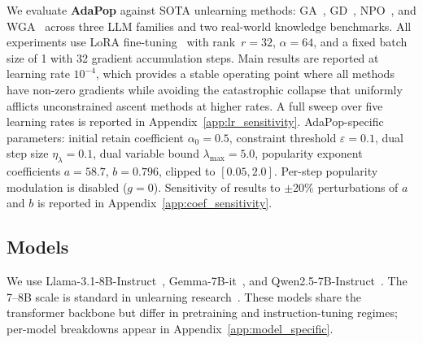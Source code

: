 







We evaluate \textbf{AdaPop} against SOTA unlearning methods: GA~\cite{jang2022knowledge}, GD~\cite{liu2022continual}, NPO~\cite{zhang2024negative}, and WGA~\cite{wang2025rethinking} across three LLM families and two real-world knowledge benchmarks. All experiments use LoRA fine-tuning~\cite{hu2021lora} with rank~$r{=}32$, $\alpha{=}64$, and a fixed batch size of 1 with 32 gradient accumulation steps. Main results are reported at learning rate $10^{-4}$, which provides a stable operating point where all methods have non-zero gradients while avoiding the catastrophic collapse that uniformly afflicts unconstrained ascent methods at higher rates. A full sweep over five learning rates is reported in Appendix~\ref{app:lr_sensitivity}. AdaPop-specific parameters: initial retain coefficient $\alpha_0 = 0.5$, constraint threshold $\varepsilon = 0.1$, dual step size $\eta_\lambda = 0.1$, dual variable bound $\lambda_{\max} = 5.0$, popularity exponent coefficients $a{=}58.7$, $b{=}0.796$, clipped to $[0.05, 2.0]$. Per-step popularity modulation is disabled ($g=0$). Sensitivity of results to $\pm$20\% perturbations of $a$ and $b$ is reported in Appendix~\ref{app:coef_sensitivity}.

\subsection{Models}
We use Llama-3.1-8B-Instruct~\cite{grattafiori2024llama}, Gemma-7B-it~\cite{team2024gemma}, and Qwen2.5-7B-Instruct~\cite{qwen2025}. The 7--8B scale is standard in unlearning research~\cite{zhang2024negative, yao2024large, jin2024rwku}. These models share the transformer backbone but differ in pretraining and instruction-tuning regimes; per-model breakdowns appear in Appendix~\ref{app:model_specific}.

